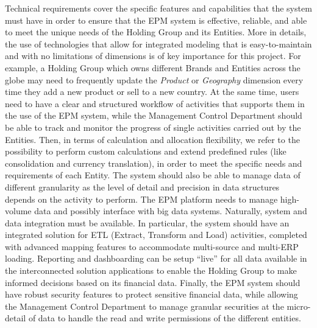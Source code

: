 \documentclass[12pt,a4paper,openright,twoside]{book}
\begin{document}
Technical requirements cover the specific features and capabilities that the system must have in order to ensure that the EPM system is effective, reliable, and able to meet the unique needs of the Holding Group and its Entities.
%
More in details, the use of technologies that allow for integrated modeling that is easy-to-maintain and with no limitations of dimensions is of key importance for this project.
%
For example, a Holding Group which owns different Brands and Entities across the globe may need to frequently update the \textit{Product} or \textit{Geography} dimension every time they add a new product or sell to a new country.
%
At the same time, users need to have a clear and structured workflow of activities that supports them in the use of the EPM system, while the Management Control Department should be able to track and monitor the progress of single activities carried out by the Entities.
%
Then, in terms of calculation and allocation flexibility, we refer to the possibility to perform custom calculations and extend predefined rules (like consolidation and currency translation), in order to meet the specific needs and requirements of each Entity.
%
The system should also be able to manage data of different granularity as the level of detail and precision in data structures depends on the activity to perform.
%
The EPM platform needs to manage high-volume data and possibly interface with big data systems.
%
Naturally, system and data integration must be available.
%
In particular, the system should have an integrated solution for ETL (Extract, Transform and Load) activities, completed with advanced mapping features to accommodate multi-source and multi-ERP loading.
%
Reporting and dashboarding can be setup ``live'' for all data available in the interconnected solution
applications to enable the Holding Group to make informed decisions based on its financial data.
%
Finally, the EPM system should have robust security features to protect sensitive financial data, while allowing the Management Control Department to manage granular securities at the micro-detail of data to handle the read and write permissions of the different entities.
\end{document}
